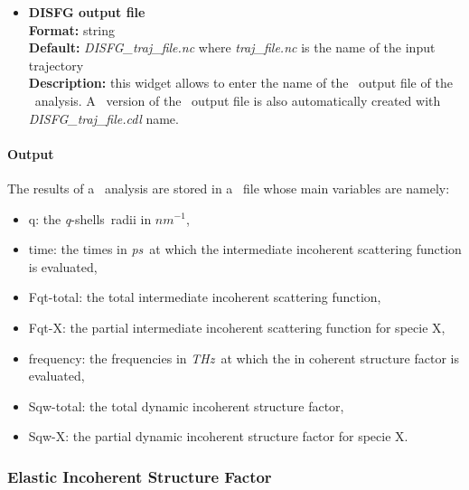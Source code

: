 \documentclass[a4paper,11pt]{report}
\newcommand{\ps}{\textit{ps}}
\newcommand{\invnm}{$nm^{-1}$}
\newcommand{\thz}{\textit{THz}}
\newcommand{\qshells}{\textit{q}-shells}
\begin{document}
\begin{itemize}
\hypertarget{disfg_disfg_output_file}{}
\item \textbf{DISFG output file}\\
\textbf{Format:} string\\
\textbf{Default:} \textit{DISFG\_traj\_file.nc} where \textit{traj\_file.nc} is the name of the input trajectory\\
\textbf{Description:} this widget allows to enter the name of the \NetCDF\ output file of the \DISFG\ analysis. A \CDL\ 
version of the \NetCDF\ output file is also automatically created with \textit{DISFG\_traj\_file.cdl} name.
\end{itemize}

\paragraph{Output\\}
The results of a \DISFG\ analysis are stored in a \NetCDF\ file whose main variables are namely:
\begin{itemize}
\item q: the \qshells\ radii in \invnm ,
\item time: the times in \ps\ at which the intermediate incoherent scattering function is evaluated,
\item Fqt-total: the total intermediate incoherent scattering function,
\item Fqt-X: the partial intermediate incoherent scattering function for specie X,
\item frequency: the frequencies in \thz\ at which the in coherent structure factor is evaluated,
\item Sqw-total: the total dynamic incoherent structure factor,
\item Sqw-X: the partial dynamic incoherent structure factor for specie X.
\end{itemize}

\subsubsection{Elastic Incoherent Structure Factor}
\label{eisf}
\end{document}
